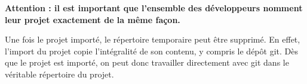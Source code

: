\documentclass[10pt,oneside,a4paper]{book} %
\begin{document}
\textbf{Attention : il est important que l’ensemble des développeurs nomment leur projet exactement de la même façon.}

Une fois le projet importé, le répertoire temporaire peut être supprimé. En effet, l’import du projet copie l’intégralité de son contenu, y compris le dépôt git. Dès que le projet est importé, on peut donc travailler directement avec git dans le véritable répertoire du projet.
\end{document}
